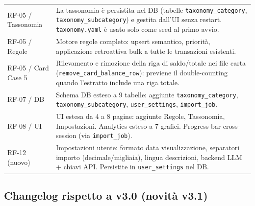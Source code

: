 \documentclass[11pt, a4paper]{article}
\begin{document}
\begin{center}
\begin{longtable}{@{}L{3cm} L{10.5cm}@{}}
RF-05 / Tassonomia  & La tassonomia è persistita nel DB (tabelle \texttt{taxonomy\_category},
                       \texttt{taxonomy\_subcategory}) e gestita dall'UI senza restart.
                       \texttt{taxonomy.yaml} è usato solo come seed al primo avvio. \\[3pt]
RF-05 / Regole      & Motore regole completo: upsert semantico, priorità, applicazione
                       retroattiva bulk a tutte le transazioni esistenti. \\[3pt]
RF-05 / Card Case 5 & Rilevamento e rimozione della riga di saldo/totale nei file carta
                       (\texttt{remove\_card\_balance\_row}): previene il double-counting
                       quando l'estratto include una riga totale. \\[3pt]
RF-07 / DB          & Schema DB esteso a 9 tabelle: aggiunte \texttt{taxonomy\_category},
                       \texttt{taxonomy\_subcategory}, \texttt{user\_settings},
                       \texttt{import\_job}. \\[3pt]
RF-08 / UI          & UI estesa da 4 a 8 pagine: aggiunte Regole, Tassonomia,
                       Impostazioni. Analytics esteso a 7 grafici. Progress bar
                       cross-session (via \texttt{import\_job}). \\[3pt]
RF-12 (nuovo)       & Impostazioni utente: formato data visualizzazione, separatori
                       importo (decimale/migliaia), lingua descrizioni, backend LLM +
                       chiavi API. Persistite in \texttt{user\_settings} nel DB. \\
\bottomrule
\end{longtable}
\end{center}

\subsection*{Changelog rispetto a v3.0 (novità v3.1)}
\end{document}
